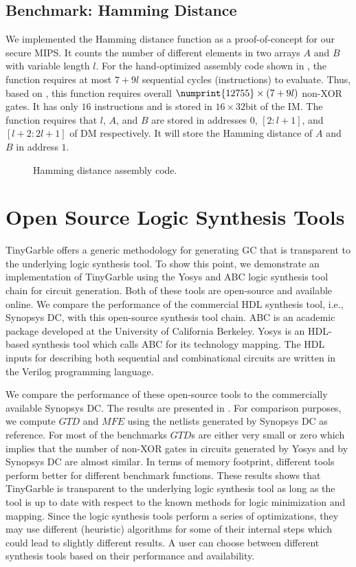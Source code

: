 \subsection{Benchmark: Hamming Distance}
We implemented the Hamming distance function as a proof-of-concept for our secure MIPS.
It counts the number of different elements in two arrays $A$ and $B$ with variable length $l$.
For the hand-optimized assembly code shown in , the function requires at most $7+9l$ sequential cycles (instructions) to evaluate.
Thus, based on , this function requires overall $\numprint{12755}\times(7+9l)$ non-XOR gates.
It has only $16$ instructions and is stored in $16\times32$bit of the IM.
The function requires that $l$, $A$, and $B$ are stored in addresses $0$, $[2:l+1]$, and $[l+2:2l+1]$ of DM respectively.
It will store the Hamming distance of $A$ and $B$ in address $1$.

\begin{figure}[ht]

\caption{Hamming distance assembly code.}\label{figure:hamminassembly}
\end{figure}

\section{Open Source Logic Synthesis Tools}
TinyGarble offers a generic methodology for generating GC that is transparent to the underlying logic synthesis tool.
To show this point, we demonstrate an implementation of TinyGarble using the Yosys \cite{tool:Yosys} and ABC \cite{tool:ABC} logic synthesis tool chain for circuit generation.
Both of these tools are open-source and available online.
We compare the performance of the commercial HDL synthesis tool, i.e., Synopsys DC, with this open-source synthesis tool chain.
ABC is an academic package developed at the University of California Berkeley.
Yosys is an HDL-based synthesis tool which calls ABC for its technology mapping.
The HDL inputs for describing both sequential and combinational circuits are written in the Verilog programming language.

We compare the performance of these open-source tools to the commercially available Synopsys DC.
The results are presented in .
For comparison purposes, we compute $\mathit{GTD}$ and $\mathit{MFE}$ using the netlists generated by Synopsys DC as reference.
For most of the benchmarks $\mathit{GTD}$s are either very small or zero which implies that the number of non-XOR gates in circuits generated by Yosys and by Synopsys DC are almost similar.
In terms of memory footprint, different tools perform better for different benchmark functions.
These results shows that TinyGarble is transparent to the underlying logic synthesis tool as long as the tool is up to date with respect to the known methods for logic minimization and mapping.
Since the logic synthesis tools perform a series of optimizations, they may use different (heuristic) algorithms for some of their internal steps which could lead to slightly different results.
A user can choose between different synthesis tools based on their performance and availability.

